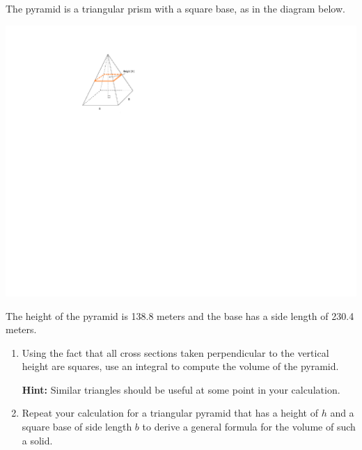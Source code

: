 \documentclass[12pt]{article}
\newif\ifans
\begin{document}
\begin{enumerate}
The pyramid is a triangular prism with a square base, as in the diagram below.  

\begin{center}
\includegraphics[scale=1.3]{pyramid.pdf}
\end{center}

The height of the pyramid is 138.8 meters and the base has a side length of 230.4 meters.  

\begin{enumerate} 

\item Using the fact that all cross sections taken perpendicular to the vertical height are squares, use an integral to compute the volume of the pyramid.

{\bf Hint:} Similar triangles should be useful at some point in your calculation.

\ifans{\fbox{$V\approx2,456,027$ square meters}} \fi

\item Repeat your calculation for a triangular pyramid that has a height of $h$ and a square base of side length $b$ to derive a general formula for the volume of such a solid.

\ifans{\fbox{$V=\int_0^h \left(\frac{b}{h}z\right)^2 \,dz=\frac{1}{3}b^2h$}} \fi

\end{enumerate}

\end{enumerate}
\end{document}
